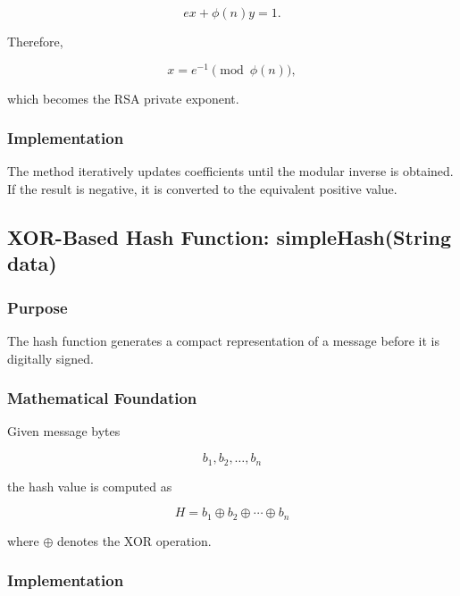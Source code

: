 \documentclass[12pt]{article}
\begin{document}
\begin{equation}
ex+\phi(n)y=1.
\end{equation}

Therefore,

\begin{equation}
x=e^{-1}\pmod{\phi(n)},
\end{equation}

which becomes the RSA private exponent.

\subsubsection{Implementation}

The method iteratively updates coefficients until the modular inverse is
obtained. If the result is negative, it is converted to the equivalent positive
value.


\subsection{XOR-Based Hash Function: simpleHash(String data)}

\subsubsection{Purpose}

The hash function generates a compact representation of a message before it is
digitally signed.

\subsubsection{Mathematical Foundation}

Given message bytes

\begin{equation}
b_1,b_2,\ldots,b_n
\end{equation}

the hash value is computed as

\begin{equation}
H=b_1 \oplus b_2 \oplus \cdots \oplus b_n
\end{equation}

where $\oplus$ denotes the XOR operation.

\subsubsection{Implementation}
\end{document}
